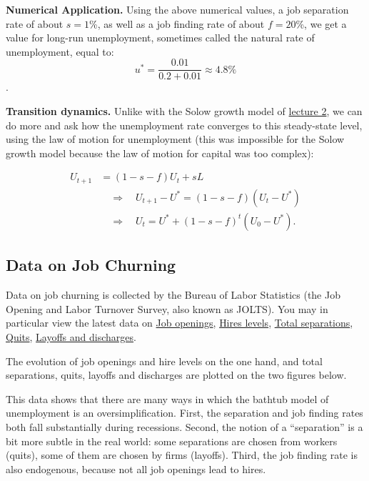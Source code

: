 \documentclass[]{book}
\theoremstyle{definition}
\theoremstyle{definition}
\theoremstyle{definition}
\theoremstyle{remark}
\begin{document}
\textbf{Numerical Application.} Using the above numerical values, a job
separation rate of about \(s=1\)\%, as well as a job finding rate of
about \(f=20\)\%, we get a value for long-run unemployment, sometimes
called the natural rate of unemployment, equal to:
\[u^{*}=\frac{0.01}{0.2 + 0.01}\approx 4.8\%\].

\textbf{Transition dynamics.} Unlike with the Solow growth model of
\protect\hyperlink{solow}{lecture 2}, we can do more and ask how the
unemployment rate converges to this steady-state level, using the law of
motion for unemployment (this was impossible for the Solow growth model
because the law of motion for capital was too complex):

\[
\begin{aligned}
U_{t+1}&=\left(1-s-f\right)U_{t}+sL\\
& \quad\Rightarrow\quad U_{t+1}-U^{*}=\left(1-s-f\right)\left(U_{t}-U^{*}\right)\\
    & \quad\Rightarrow\quad U_{t}=U^{*}+\left(1-s-f\right)^{t}\left(U_{0}-U^{*}\right).
\end{aligned}
\]

\subsection{Data on Job Churning}\label{data-on-job-churning}

Data on job churning is collected by the Bureau of Labor Statistics (the
Job Opening and Labor Turnover Survey, also known as JOLTS). You may in
particular view the latest data on
\href{https://www.bls.gov/news.release/jolts.t01.htm}{Job openings},
\href{https://www.bls.gov/news.release/jolts.t02.htm}{Hires levels},
\href{https://www.bls.gov/news.release/jolts.t03.htm}{Total
separations},
\href{https://www.bls.gov/news.release/jolts.t04.htm}{Quits},
\href{https://www.bls.gov/news.release/jolts.t05.htm}{Layoffs and
discharges}.

The evolution of job openings and hire levels on the one hand, and total
separations, quits, layoffs and discharges are plotted on the two
figures below.

This data shows that there are many ways in which the bathtub model of
unemployment is an oversimplification. First, the separation and job
finding rates both fall substantially during recessions. Second, the
notion of a ``separation'' is a bit more subtle in the real world: some
separations are chosen from workers (quits), some of them are chosen by
firms (layoffs). Third, the job finding rate is also endogenous, because
not all job openings lead to hires.
\end{document}
